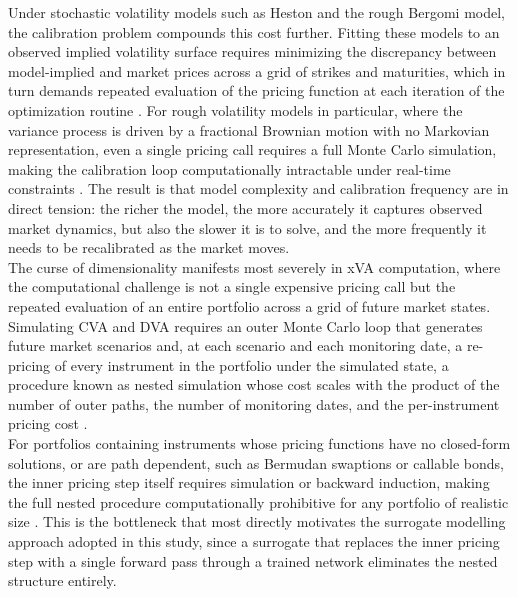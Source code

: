     
    \noindent
    Under stochastic volatility models such as Heston and the rough Bergomi model, the calibration problem compounds this cost further. Fitting these models to an observed implied volatility surface requires minimizing the discrepancy between model-implied and market prices across a grid of strikes and maturities, which in turn demands repeated evaluation of the pricing function at each iteration of the optimization routine \cite{horvath2020deeplearning}. For rough volatility models in particular, where the variance process is driven by a fractional Brownian motion with no Markovian representation, even a single pricing call requires a full Monte Carlo simulation, making the calibration loop computationally intractable under real-time constraints \cite{becker2023learning}. The result is that model complexity and calibration frequency are in direct tension: the richer the model, the more accurately it captures observed market dynamics, but also the slower it is to solve, and the more frequently it needs to be recalibrated as the market moves. \\

    \noindent
    The curse of dimensionality manifests most severely in xVA computation, where the computational challenge is not a single expensive pricing call but the repeated evaluation of an entire portfolio across a grid of future market states. Simulating CVA and DVA requires an outer Monte Carlo loop that generates future market scenarios and, at each scenario and each monitoring date, a re-pricing of every instrument in the portfolio under the simulated state, a procedure known as nested simulation whose cost scales with the product of the number of outer paths, the number of monitoring dates, and the per-instrument pricing cost \cite{andersson2021deeplearning, goudenege2025xva}. \\

    \noindent
    For portfolios containing instruments whose pricing functions have no closed-form solutions, or are path dependent, such as Bermudan swaptions or callable bonds, the inner pricing step itself requires simulation or backward induction, making the full nested procedure computationally prohibitive for any portfolio of realistic size \cite{dhandapani2024optimizing}. This is the bottleneck that most directly motivates the surrogate modelling approach adopted in this study, since a surrogate that replaces the inner pricing step with a single forward pass through a trained network eliminates the nested structure entirely. \\


